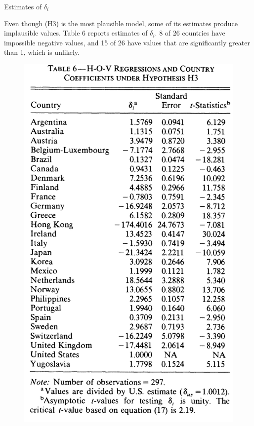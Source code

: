 \documentclass[aspectratio=169]{beamer}
\begin{document}

\begin{frame}{Estimates of $ \delta_i $}

Even though (H3) is the most plausible model, some of its estimates produce implausible values.  Table 6 reports estimates of $ \delta_i $.  8 of 26 countries have impossible negative values, and 15 of 26 have values that are significantly greater than 1, which is unlikely.

\begin{figure}
    \centering
    \includegraphics[scale = 0.45]{Table 6.png}
    \label{fig:Table6}
\end{figure} 
    
\end{frame}
\end{document}
